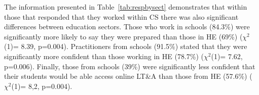 \documentclass[conference]{IEEEtran}
\begin{document}


The information presented in Table~\ref{tab:respbysect} demonstrates
that within those that responded that they worked within CS
there was also significant differences between education
sectors. Those who work in schools (84.3\%) were significantly more
likely to say they were prepared than those in HE (69\%) ($\chi^2$(1)=
8.39, p=0.004). Practitioners from schools (91.5\%) stated that they
were significantly more confident than those working in HE (78.7\%)
($\chi^2$(1)= 7.62, p=0.006). Finally, those from schools (39\%) were
significantly less confident that their students would be able access
online LT\&A than those from HE (57.6\%) ($\chi^2$(1)= 8,2,
p=0.004).

\end{document}
